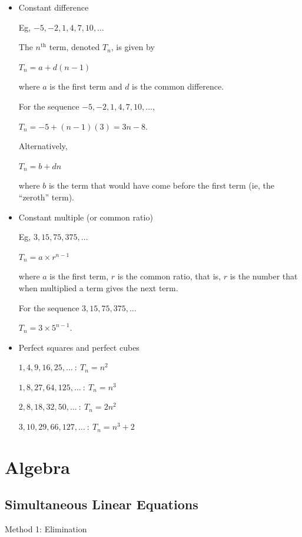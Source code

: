 \documentclass[twocolumn]{article}
\begin{document}
\begin{itemize}  
	
\item Constant difference

Eg, $-5, -2, 1, 4, 7, 10, \ldots$

The $n^{\text{th}}$ term, denoted $T_n$, is given by

$T_n = a + d(n-1)$

where $a$ is the first term and $d$ is the common difference.

For the sequence $-5, -2, 1, 4, 7, 10, \ldots$, 

$T_n = -5 + (n-1)(3) = 3n - 8$.

Alternatively,

$T_n = b + dn$

where $b$ is the term that would have come before the first term (ie, the ``zeroth'' term).

\item Constant multiple (or common ratio)

Eg, $3, 15, 75, 375, \ldots$

$T_n = a \times r^{n-1}$

where $a$ is the first term, $r$ is the common ratio, that is, $r$ is the number that when multiplied a term gives the next term.

For the sequence $3, 15, 75, 375, \ldots$

$T_n = 3 \times 5^{n-1}$.

\item Perfect squares and perfect cubes

$1, 4, 9, 16, 25, \ldots \ : \ T_n = n^2$

$1, 8, 27, 64, 125, \ldots \ : \ T_n = n^3$

$2, 8, 18, 32, 50, \ldots \ : \ T_n = 2n^2$

$3, 10, 29, 66, 127, \ldots \ : \ T_n = n^3+2$
	
\end{itemize}  	

\section*{Algebra}

\subsection*{Simultaneous Linear Equations}

Method 1: Elimination
\end{document}
